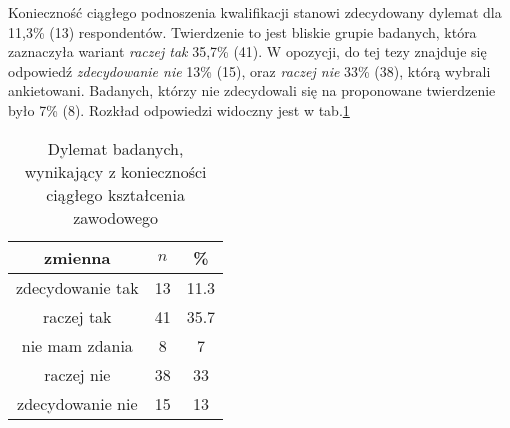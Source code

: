 

 Konieczność ciągłego podnoszenia kwalifikacji stanowi zdecydowany dylemat dla 11,3\% (13) respondentów. Twierdzenie to jest bliskie grupie badanych, która zaznaczyła wariant \textit{raczej tak} 35,7\% (41). W opozycji, do tej tezy znajduje się odpowiedź \textit{zdecydowanie nie} 13\% (15), oraz \textit{raczej nie} 33\% (38), którą wybrali ankietowani. Badanych, którzy nie zdecydowali się na proponowane twierdzenie było 7\% (8). Rozkład odpowiedzi widoczny jest w tab.\ref{tab:Q14}

\begin{table}[H]
\caption{Dylemat badanych, wynikający z konieczności ciągłego kształcenia zawodowego}
\centering
\begin{tabular}{ | c | c | c |}
\hline
zmienna & $n$ & \% \\
\hline
zdecydowanie tak  &  13  & 11.3 \\
\hline
raczej tak  &  41  & 35.7 \\
\hline
nie mam zdania  &  8  & 7 \\
\hline
raczej nie  &  38  & 33 \\
\hline
zdecydowanie nie  &  15  & 13 \\
\hline
\end{tabular}
\label{tab:Q14}
\end{table}
